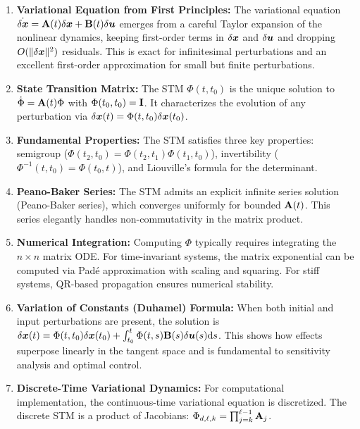 \begin{enumerate}

\item \textbf{Variational Equation from First Principles:}
      The variational equation $\dot{\delta\bm{x}} = \mathbf{A}(t)\delta\bm{x} + \mathbf{B}(t)\delta\bm{u}$ emerges from a careful Taylor expansion
      of the nonlinear dynamics, keeping first-order terms in $\delta\bm{x}$ and $\delta\bm{u}$ and dropping $O(\|\delta\bm{x}\|^2)$ residuals.
      This is exact for infinitesimal perturbations and an excellent first-order approximation for small but
      finite perturbations.

\item \textbf{State Transition Matrix:}
      The STM $\Phi(t,t_0)$ is the unique solution to $\dot\Phi = \mathbf{A}(t)\Phi$ with $\Phi(t_0,t_0) = \mathbf{I}$.
      It characterizes the evolution of any perturbation via $\delta\bm{x}(t) = \Phi(t,t_0)\delta\bm{x}(t_0)$.

\item \textbf{Fundamental Properties:}
      The STM satisfies three key properties: semigroup ($\Phi(t_2,t_0) = \Phi(t_2,t_1)\Phi(t_1,t_0)$),
      invertibility ($\Phi^{-1}(t,t_0) = \Phi(t_0,t)$), and Liouville's formula for the determinant.

\item \textbf{Peano-Baker Series:}
      The STM admits an explicit infinite series solution (Peano-Baker series), which converges uniformly
      for bounded $\mathbf{A}(t)$. This series elegantly handles non-commutativity in the matrix product.

\item \textbf{Numerical Integration:}
      Computing $\Phi$ typically requires integrating the $n \times n$ matrix ODE. For time-invariant systems,
      the matrix exponential can be computed via Padé approximation with scaling and squaring. For stiff systems,
      QR-based propagation ensures numerical stability.

\item \textbf{Variation of Constants (Duhamel) Formula:}
      When both initial and input perturbations are present, the solution is
      $\delta\bm{x}(t) = \Phi(t,t_0)\delta\bm{x}(t_0) + \int_{t_0}^{t}\Phi(t,s)\mathbf{B}(s)\delta\bm{u}(s)\mathrm{d} s$.
      This shows how effects superpose linearly in the tangent space and is fundamental to sensitivity analysis
      and optimal control.

\item \textbf{Discrete-Time Variational Dynamics:}
      For computational implementation, the continuous-time variational equation is discretized. The discrete
      STM is a product of Jacobians: $\Phi_{d,\ell,k} = \prod_{j=k}^{\ell-1}\mathbf{A}_j$.


\end{enumerate}

